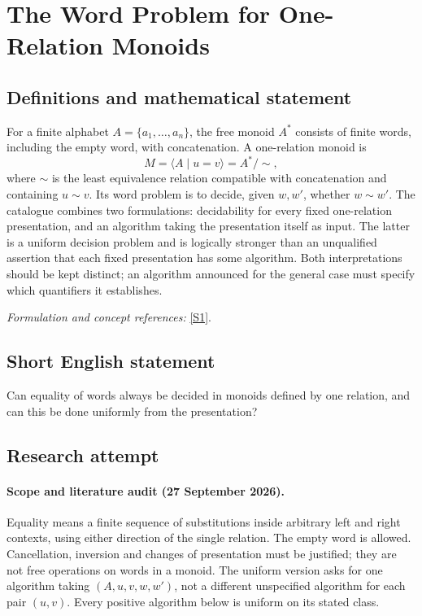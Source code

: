 \documentclass[11pt]{article}
\begin{document}
\section*{\texorpdfstring{The Word Problem for One-Relation Monoids}{The Word Problem for One-Relation Monoids}}\label{statement}
\subsection{Definitions and mathematical statement}
For a finite alphabet $A=\{a_1,\ldots,a_n\}$, the free monoid $A^*$ consists of finite words, including the empty word, with concatenation. A one-relation monoid is
\[
 M=\langle A\mid u=v\rangle=A^*/{\sim},
\]
where $\sim$ is the least equivalence relation compatible with concatenation and containing $u\sim v$. Its word problem is to decide, given $w,w'$, whether $w\sim w'$. The catalogue combines two formulations: decidability for every fixed one-relation presentation, and an algorithm taking the presentation itself as input. The latter is a uniform decision problem and is logically stronger than an unqualified assertion that each fixed presentation has some algorithm. Both interpretations should be kept distinct; an algorithm announced for the general case must specify which quantifiers it establishes.
\par\smallskip\textit{Formulation and concept references:} \href{https://arxiv.org/abs/2105.02853}{[S1]}.

\subsection{Short English statement}
Can equality of words always be decided in monoids defined by one relation, and can this be done uniformly from the presentation?
\subsection{Research attempt}
\paragraph{Scope and literature audit (27 September 2026).}
Equality means a finite sequence of substitutions inside arbitrary left
and right contexts, using either direction of the single relation.
The empty word is allowed. Cancellation, inversion and changes of
presentation must be justified; they are not free operations on words
in a monoid. The uniform version asks for one algorithm taking
$(A,u,v,w,w')$, not a different unspecified algorithm for each pair
$(u,v)$. Every positive algorithm below is uniform on its stated class.
\end{document}
